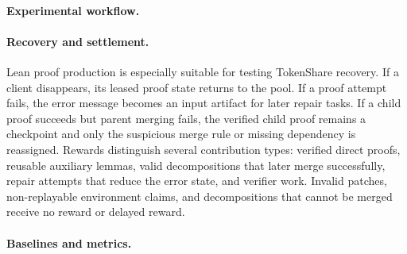 \documentclass{article}
\theoremstyle{plain}
\begin{document}
{\paragraph{Experimental workflow.}


\paragraph{Recovery and settlement.}
Lean proof production is especially suitable for testing TokenShare recovery. If a client disappears, its leased proof state returns to the pool. If a proof attempt fails, the error message becomes an input artifact for later repair tasks. If a child proof succeeds but parent merging fails, the verified child proof remains a checkpoint and only the suspicious merge rule or missing dependency is reassigned. Rewards distinguish several contribution types: verified direct proofs, reusable auxiliary lemmas, valid decompositions that later merge successfully, repair attempts that reduce the error state, and verifier work. Invalid patches, non-replayable environment claims, and decompositions that cannot be merged receive no reward or delayed reward.

\paragraph{Baselines and metrics.}



}


%
%
\end{document}

